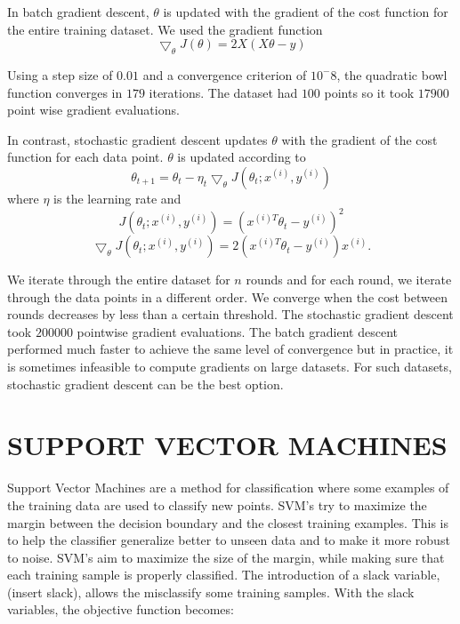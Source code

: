 \documentclass[a4paper,twoside]{article}
\begin{document}
In batch gradient descent, $\theta$ is updated with the gradient of the cost function for the entire training dataset.
We used the gradient function
\begin{equation}
\bigtriangledown_\theta J(\theta) = 2X(X\theta - y)
\end{equation}

Using a step size of $0.01$ and a convergence criterion of $10^-8$, the quadratic bowl function converges in $179$ iterations. The dataset had $100$ points so it took $17900$ point wise gradient evaluations.

In contrast, stochastic gradient descent updates $\theta$ with the gradient of the cost function for each data point. $\theta$ is updated according to 
\begin{equation}
\theta_{t+1} = \theta_t - \eta_t \bigtriangledown_\theta J(\theta_t; x^{(i)}, y^{(i)})
\end{equation}
where $\eta$ is the learning rate and
\begin{equation}
J(\theta_t; x^{(i)}, y^{(i)}) = (x^{(i)T} \theta_t - y^{(i)})^2
\end{equation}
\begin{equation}
\bigtriangledown_\theta J(\theta_t; x^{(i)}, y^{(i)}) = 2(x^{(i)T} \theta_t - y^{(i)}) x^{(i)}.
\end{equation}

 We iterate through the entire dataset for $n$ rounds and for each round, we iterate through the data points in a different order. We converge when the cost between rounds decreases by less than a certain threshold. The stochastic gradient descent took $200000$ pointwise gradient evaluations. The batch gradient descent performed much faster to achieve the same level of convergence but in practice, it is sometimes infeasible to compute gradients on large datasets. For such datasets, stochastic gradient descent can be the best option.



\section{\uppercase{Support Vector Machines}}

Support Vector Machines are a method for classification where some examples of the training data are used to classify new points. SVM's try to maximize the margin between the decision boundary and the closest training examples. This is to help the classifier generalize better to unseen data and to make it more robust to noise. SVM's aim to maximize the size of the margin, while making sure that each training sample is properly classified. The introduction of a slack variable, (insert slack), allows the misclassify some training samples. With the slack variables, the objective function becomes:
\end{document}
